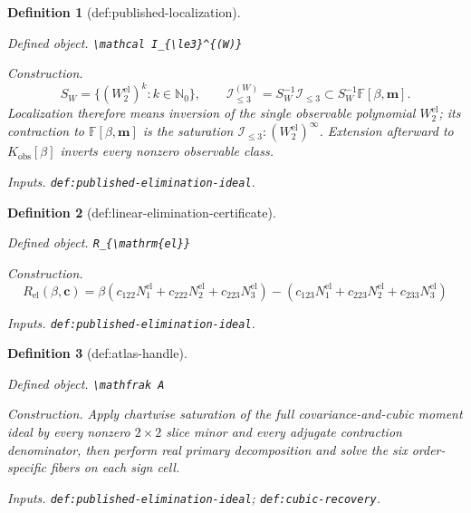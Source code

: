 \documentclass{article}
\newtheorem{definition}{Definition}
\begin{document}
\begin{definition}[def:published-localization]\label{def:published-localization}
\par\smallskip\noindent\emph{Defined object.} \texttt{\textbackslash{}\allowbreak{}mathcal I\_\allowbreak{}\{\textbackslash{}\allowbreak{}le3\}\allowbreak{}\textasciicircum{}\{(W)\}\allowbreak{}}
\par\smallskip\noindent\emph{Construction.} \[S_W=\{(W_2^{\mathrm{el}})^k:k\in\mathbb N_0\},\qquad \mathcal I_{\le3}^{(W)}=S_W^{-1}\mathcal I_{\le3}\subset S_W^{-1}\mathbb F[\beta,\mathbf m].\] Localization therefore means inversion of the single observable polynomial \(W_2^{\mathrm{el}}\); its contraction to \(\mathbb F[\beta,\mathbf m]\) is the saturation \(\mathcal I_{\le3}:(W_2^{\mathrm{el}})^\infty\). Extension afterward to \(K_{\mathrm{obs}}[\beta]\) inverts every nonzero observable class.
\par\smallskip\noindent\emph{Inputs.} \texttt{def:\allowbreak{}published-\allowbreak{}elimination-\allowbreak{}ideal}.
\end{definition}

\begin{definition}[def:linear-elimination-certificate]\label{def:linear-elimination-certificate}
\par\smallskip\noindent\emph{Defined object.} \texttt{R\_\allowbreak{}\{\textbackslash{}\allowbreak{}mathrm\{el\}\allowbreak{}\}\allowbreak{}}
\par\smallskip\noindent\emph{Construction.} \[R_{\mathrm{el}}(\beta,\mathbf c)=\beta(c_{122}N^{\mathrm{el}}_1+c_{222}N^{\mathrm{el}}_2+c_{223}N^{\mathrm{el}}_3)-(c_{123}N^{\mathrm{el}}_1+c_{223}N^{\mathrm{el}}_2+c_{233}N^{\mathrm{el}}_3)\]
\par\smallskip\noindent\emph{Inputs.} \texttt{def:\allowbreak{}published-\allowbreak{}elimination-\allowbreak{}ideal}.
\end{definition}

\begin{definition}[def:atlas-handle]\label{def:atlas-handle}
\par\smallskip\noindent\emph{Defined object.} \texttt{\textbackslash{}\allowbreak{}mathfrak A}
\par\smallskip\noindent\emph{Construction.} Apply chartwise saturation of the full covariance-and-cubic moment ideal by every nonzero \(2\times2\) slice minor and every adjugate contraction denominator, then perform real primary decomposition and solve the six order-specific fibers on each sign cell.
\par\smallskip\noindent\emph{Inputs.} \texttt{def:\allowbreak{}published-\allowbreak{}elimination-\allowbreak{}ideal}; \texttt{def:\allowbreak{}cubic-\allowbreak{}recovery}.
\end{definition}
\end{document}
